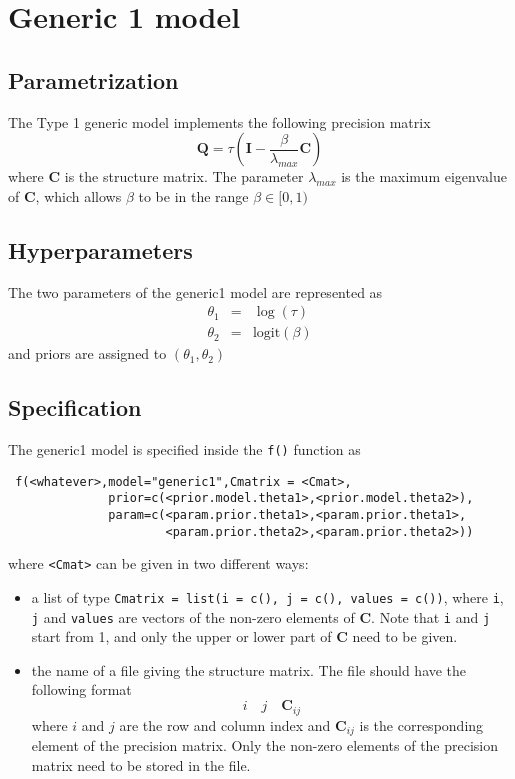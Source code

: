 \documentclass[a4paper,11pt]{article}
\begin{document}
\section*{Generic 1 model}

\subsection*{Parametrization}

The Type 1 generic model implements the following precision matrix
\[
\mathbf{Q}=\tau(\mathbf{I}-\frac{\beta}{\lambda_{max}}\mathbf{C})
\]
where $\mathbf{C}$ is the structure matrix. The parameter
$\lambda_{max}$ is the maximum eigenvalue of $\mathbf{C}$, which
allows $\beta$ to be in the range $\beta\in[0,1)$
\subsection*{Hyperparameters}

The two parameters of the generic1 model are represented as
\begin{eqnarray*}
    \theta_1 &= & \log(\tau)\\
    \theta_2 &=&\text{logit}(\beta)
\end{eqnarray*}
and priors are assigned to $(\theta_1,\theta_2)$

\subsection*{Specification}

The generic1 model is specified inside the {\tt f()} function as
\begin{verbatim}
 f(<whatever>,model="generic1",Cmatrix = <Cmat>,
              prior=c(<prior.model.theta1>,<prior.model.theta2>),
              param=c(<param.prior.theta1>,<param.prior.theta1>,
                      <param.prior.theta2>,<param.prior.theta2>))
\end{verbatim}
where {\tt <Cmat>} can be given in two different ways:
\begin{itemize}
\item a list of type {\tt Cmatrix = list(i = c(), j = c(), values =
        c())}, where {\tt i}, {\tt j} and {\tt values} are vectors of the
    non-zero elements of $\mathbf{C}$. Note that {\tt i} and {\tt j}
    start from 1, and only the upper or lower part of $\mathbf{C}$
    need to be given.
\item the name of a file giving the structure matrix. The file should
    have the following format
    \[
    i\quad j\quad \mathbf{C}_{ij}
    \]
    where $i$ and $j$ are the row and column index and
    $\mathbf{C}_{ij}$ is the corresponding element of the precision
    matrix. Only the non-zero elements of the precision matrix need to
    be stored in the file.
\end{itemize}
\end{document}
